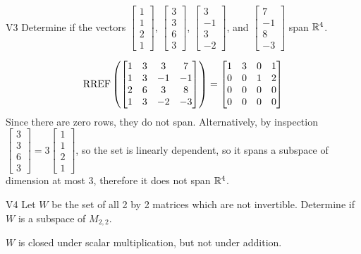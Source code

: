 \documentclass{sbgLAquiz}
\begin{document}
\begin{problem}{V3}
Determine if the vectors $\begin{bmatrix} 1 \\ 1 \\ 2 \\1 \end{bmatrix}$, $\begin{bmatrix} 3 \\ 3 \\ 6 \\ 3 \end{bmatrix}$, $\begin{bmatrix}3 \\ -1 \\ 3 \\ -2\end{bmatrix}$, and $\begin{bmatrix} 7 \\ -1 \\ 8 \\ -3 \end{bmatrix}$  span $\mathbb{R}^4$.
\end{problem}
\begin{solution}
$$\operatorname{RREF}\left(\begin{bmatrix} 1 & 3 & 3 & 7 \\ 1 & 3 & -1 & -1 \\ 2 & 6 & 3 & 8 \\ 1 & 3 & -2 & -3 \end{bmatrix}\right) = \begin{bmatrix} 1 & 3 & 0 & 1 \\ 0 & 0 & 1 & 2 \\ 0 & 0 & 0 & 0 \\ 0 & 0 & 0 & 0  \end{bmatrix}$$
Since there are zero rows, they do not span.  Alternatively, by inspection $\begin{bmatrix} 3 \\ 3 \\ 6 \\ 3 \end{bmatrix}=3\begin{bmatrix} 1 \\ 1 \\ 2 \\1 \end{bmatrix}$, so the set is linearly dependent, so it spans a subspace of dimension at most 3, therefore it does not span $\mathbb{R}^4$.
\end{solution}

\begin{extract}\newpage\end{extract}
\begin{problem}{V4} 
Let $W$ be the set of all 2 by 2 matrices which are not invertible.  Determine if $W$ is a subspace of $M_{2,2}$.
\end{problem}
\begin{solution}
$W$ is closed under scalar multiplication, but not under addition. 
\end{solution}
\end{document}

